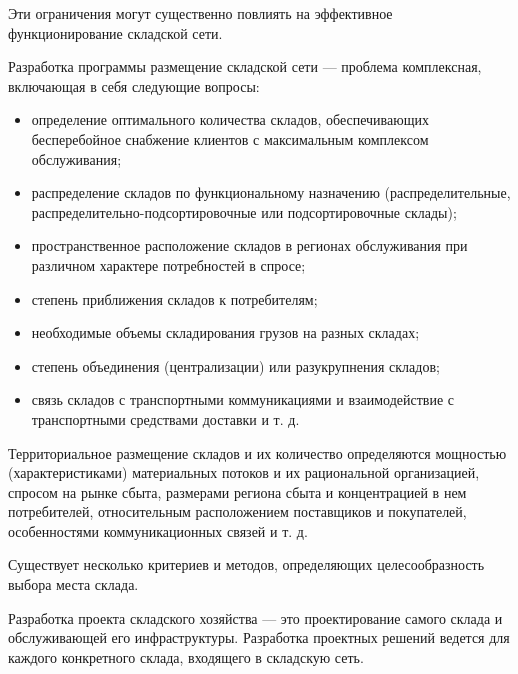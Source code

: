 Эти ограничения могут существенно повлиять на эффективное функционирование складской сети.

Разработка программы размещение складской сети --- проблема комплексная, включающая в себя следующие вопросы:
\begin{itemize}
	\item определение оптимального количества складов, обеспечивающих бесперебойное снабжение клиентов с максимальным комплексом обслуживания;
	\item распределение складов по функциональному назначению (распределительные, распределительно-подсортировочные или подсортировочные склады);
	\item пространственное расположение складов в регионах обслуживания при различном характере потребностей в спросе;
	\item степень приближения складов к потребителям;
	\item необходимые объемы складирования грузов на разных складах;
	\item степень объединения (централизации) или разукрупнения складов;
	\item связь складов с транспортными коммуникациями и взаимодействие с транспортными средствами доставки и т. д.
\end{itemize}

Территориальное размещение складов и их количество определяются мощностью (характеристиками) материальных потоков и их рациональной организацией, спросом на рынке сбыта, размерами региона сбыта и концентрацией в нем потребителей, относительным расположением поставщиков и покупателей, особенностями коммуникационных связей и т. д.

Существует несколько критериев и методов, определяющих целесообразность выбора места склада.

Разработка проекта складского хозяйства --- это проектирование самого склада и обслуживающей его инфраструктуры.
Разработка проектных решений ведется для каждого конкретного склада, входящего в складскую сеть.